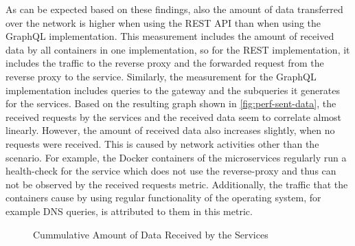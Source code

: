 As can be expected based on these findings, also the amount of data transferred over the network is higher when using the \ac{REST} \ac{API} than when using the GraphQL implementation.
This measurement includes the amount of received data by all containers in one implementation, so for the \ac{REST} implementation, it includes the traffic to the reverse proxy and the forwarded request from the reverse proxy to the service.
Similarly, the measurement for the GraphQL implementation includes queries to the gateway and the subqueries it generates for the services.
Based on the resulting graph shown in \autoref{fig:perf-sent-data}, the received requests by the services and the received data seem to correlate almost linearly.
However, the amount of received data also increases slightly, when no requests were received.
This is caused by network activities other than the scenario.
For example, the Docker containers of the microservices regularly run a health-check for the service which does not use the reverse-proxy and thus can not be observed by the received requests metric.
Additionally, the traffic that the containers cause by using regular functionality of the operating system, for example \ac{DNS} queries, is attributed to them in this metric.

\begin{figure}[tb!]
    \centering
    \caption{Cummulative Amount of Data Received by the Services}\label{fig:perf-sent-data}    
\end{figure}

